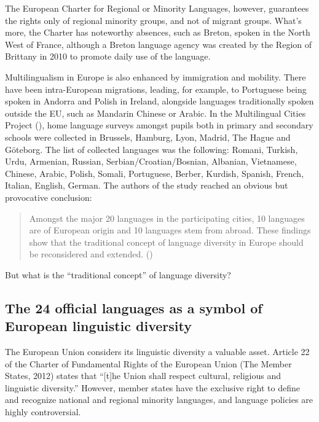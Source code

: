 \documentclass[output=paper]{langscibook}
\begin{document}
The European Charter for Regional or Minority Languages, however, guarantees the rights only of regional minority groups, and not of migrant groups. What’s more, the Charter has noteworthy absences, such as Breton, spoken in the North West of France, although a Breton language agency was created by the Region of Brittany in 2010 to promote daily use of the language.

\begin{sloppypar}
Multilingualism in Europe is also enhanced by immigration and mobility. There have been intra-European migrations, leading, for example, to Portuguese being spoken in Andorra and Polish in Ireland, alongside languages traditionally spoken outside the EU, such as Mandarin Chinese or Arabic. In the Multilingual Cities Project (\citealt{ExtraYagmur2005}), home language surveys amongst pupils both in primary and secondary schools were collected in Brussels, Hamburg, Lyon, Madrid, The Hague and Göteborg. The list of collected languages was the following: Romani, Turkish, Urdu, Armenian, Russian, Serbian/Croatian/Bos\-nian, Albanian, Vietnamese, Chinese, Arabic, Polish, Somali, Portuguese, Berber, Kurdish, Spanish, French, Italian, English, German. The authors of the study reached an obvious but provocative conclusion:
\end{sloppypar}

\begin{quote}
Amongst the major 20 languages in the participating cities, 10 languages are of European origin and 10 languages stem from abroad. These findings show that the traditional concept of language diversity in Europe should be reconsidered and extended. (\citealt{ExtraYagmur2005})
\end{quote}

But what is the “traditional concept” of language diversity? 


\subsection{The 24 official languages as a symbol of European linguistic diversity}\largerpage

The European Union considers its linguistic diversity a valuable asset. Article 22 of the Charter of Fundamental Rights of the European Union (The Member States, 2012) states that “[t]he Union shall respect cultural, religious and linguistic diversity.” However, member states have the exclusive right to define and recognize national and regional minority languages, and language policies are highly controversial. 
\end{document}

